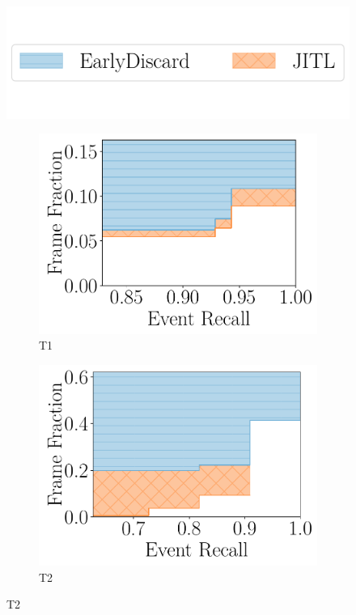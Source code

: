 \begin{figure}
    \centering
    \includegraphics[trim={0 1.8cm 0 0},clip,width=0.7\linewidth]{FIGS/fig-jitl-legend.pdf}\\
    \vspace{.5in}
    \begin{subfigure}[b]{.48\linewidth}
    \centering
    \includegraphics[width=\linewidth]{FIGS/fig-jitl-okutama-eventrecall-step.pdf}
    \caption{T1}
    \end{subfigure}
    \begin{subfigure}[b]{.48\linewidth}
    \centering
    \includegraphics[width=\linewidth]{FIGS/fig-jitl-stanford-eventrecall-step.pdf}
    \caption{T2}
    \end{subfigure}


\end{figure}

